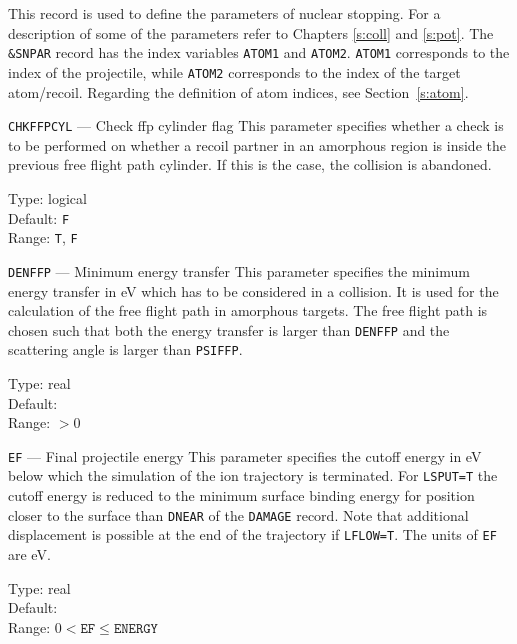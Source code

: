 This record is used to define the parameters of nuclear stopping. For
a description of some of the parameters refer to Chapters \ref{s:coll}
and \ref{s:pot}.  The \texttt{\&SNPAR} record has the index variables
\texttt{ATOM1} and \texttt{ATOM2}. \texttt{ATOM1} corresponds to the index 
of the projectile, while \texttt{ATOM2} corresponds to the index of the target
atom/recoil. Regarding the definition of atom indices, see Section~\ref{s:atom}.


\begin{keydescription}{\texttt{CHKFFPCYL} --- Check ffp cylinder flag}
%
  This parameter specifies whether a check is to be performed on whether
  a recoil partner in an amorphous region is inside the previous free flight 
  path cylinder. If this is the case, the collision is abandoned. 
  \begin{keytab}
    Type:    \> logical \\
    Default: \> \texttt{F} \\
    Range:   \> \texttt{T}, \texttt{F}
  \end{keytab}
\end{keydescription}

\begin{keydescription}{\texttt{DENFFP} --- Minimum energy transfer}
%
  This parameter specifies the minimum energy transfer in eV which has
  to be considered in a collision. It is used for the calculation of
  the free flight path in amorphous targets. The free flight path is
  chosen such that both the energy transfer is larger than
  \texttt{DENFFP} and the scattering angle is larger than
  \texttt{PSIFFP}.
  \begin{keytab}
    Type:    \> real \\
    Default:  \\
    Range:   \> $>0$
  \end{keytab}
\end{keydescription}

\begin{keydescription}{\texttt{EF} --- Final projectile energy}
%
  This parameter specifies the cutoff energy in eV below which the
  simulation of the ion trajectory is terminated. For \texttt{LSPUT=T} the
  cutoff energy is reduced to the minimum surface binding energy for position
  closer to the surface than \texttt{DNEAR} of the \texttt{DAMAGE} record.
  Note that additional displacement is possible at the end of the trajectory if
  \texttt{LFLOW=T}. The units of \texttt{EF} are eV. 
  \begin{keytab}
    Type:    \> real \\
    Default:  \\
    Range:   \> $0 < \texttt{EF} \le \texttt{ENERGY}$
  \end{keytab}
\end{keydescription}

